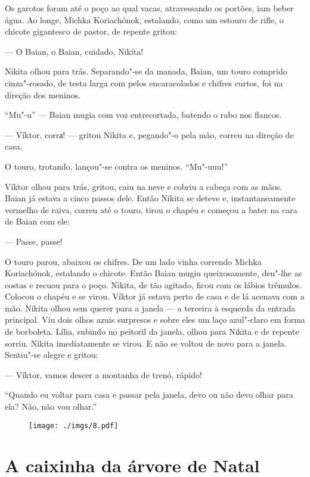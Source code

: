 Os garotos foram até o poço ao qual vacas, atravessando os portões, iam
beber água. Ao longe, Michka Koriachónok, estalando, como um estouro de
rifle, o chicote gigantesco de pastor, de repente gritou:

--- O Baian, o Baian, cuidado, Nikita!

Nikita olhou para trás. Separando"-se da manada, Baian, um touro comprido
cinza"-rosado, de testa larga com pelos encaracolados e chifres curtos,
foi na direção dos meninos.

``Mu"-u'' --- Baian mugia com voz entrecortada, batendo o rabo nos
flancos.

--- Víktor, corrа! --- gritou Nikita e, pegando"-o pela mão, correu na direção de
casa.

O touro, trotando, lançou"-se contra os meninos. ``Mu"-uuu!''

Víktor olhou para trás, gritou, caiu na neve e cobriu a cabeça com as
mãos. Baian já estava a cinco passos dele. Então Nikita se deteve e, instantaneamente
vermelho de raiva, correu até o touro, tirou o chapéu e
começou a bater na cara de Baian com ele:

--- Passe, passe!

O touro parou, abaixou os chifres. De um lado vinha correndo Michka
Koriachónok, estalando o chicote. Então Baian mugiu queixosamente,
deu"-lhe as costas e recuou para o poço. Nikita, de tão agitado, ficou com os
lábios trêmulos. Colocou o chapéu e se virou. Víktor já estava perto de
casa e de lá acenava com a mão. Nikita olhou sem querer para a janela
--- a terceira à esquerda da entrada principal. Viu dois olhos azuis
surpresos e sobre eles um laço azul"-claro em forma de borboleta. Lília,
subindo no peitoril da janela, olhou para Nikita e de repente sorriu.
Nikita imediatamente se virou. E não se voltou de novo para a janela.
Sentiu"-se alegre e gritou:

--- Víktor, vamos descer a montanha de trenó, rápido!

``Quando eu voltar para casa e passar pela janela, devo ou não devo
olhar para ela? Não, não vou olhar.''

\begin{figure}
\vspace*{-2.1cm}
\hspace*{-2.5cm}\texttt{[image: ./imgs/8.pdf]}
\end{figure}

\chapter{A caixinha da árvore de Natal}

